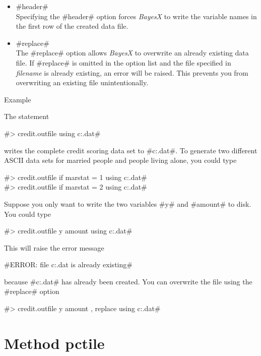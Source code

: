 

\begin{itemize}
\item #header# \\
Specifying the #header# option forces {\em BayesX} to write the
variable names in the first row of the created data file.
\item #replace# \\
The #replace# option allows {\em BayesX} to overwrite an already
existing data file. If #replace# is omitted in the option list and
the file specified in {\em filename} is already existing, an error
will be raised.
This prevents you from overwriting an existing file unintentionally.
\end{itemize}


\begin{stanza}{Example}

The statement

#> credit.outfile using c:\data\cr.dat#

writes the complete credit scoring data set to
#c:\data\cr.dat#. To generate two different
ASCII
data sets for married people and people living alone, you could type

#> credit.outfile if marstat = 1 using c:\data\crmarried.dat# \\
#> credit.outfile if marstat = 2 using c:\data\cralone.dat#

Suppose you only want to write the two variables #y# and #amount#
to disk. You could type

#> credit.outfile y amount using c:\data\cr.dat#

This will raise the error message

#ERROR: file c:\data\cr.dat is already existing#


because #c:\data\cr.dat# has already been created. You can
overwrite the file using the #replace# option

#> credit.outfile y amount , replace using c:\data\cr.dat#
\end{stanza}



\clearpage



\section{Method pctile}
\label{pcitle} 

